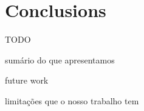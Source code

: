 \section{Conclusions}
TODO

sumário do que apresentamos

future work

limitações que o nosso trabalho tem